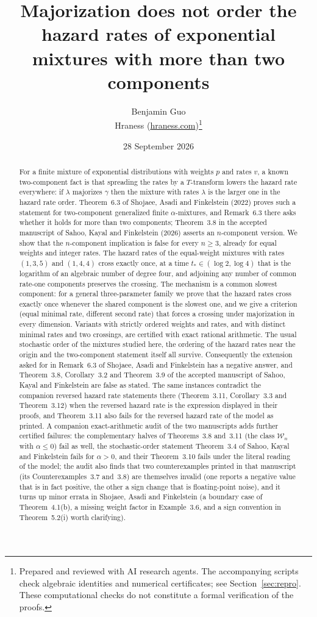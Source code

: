 \documentclass[10pt]{article}
\title{Majorization does not order the hazard rates of exponential mixtures with more than two components}
\author{Benjamin Guo\\ Hraness (\url{hraness.com})\thanks{Prepared and reviewed with AI research agents. The accompanying scripts check algebraic identities and numerical certificates; see Section~\ref{sec:repro}. These computational checks do not constitute a formal verification of the proofs.}}
\date{28 September 2026}
\theoremstyle{plain}
\theoremstyle{definition}
\theoremstyle{remark}
\begin{document}
\maketitle

\begin{abstract}
For a finite mixture of exponential distributions with weights $p$ and rates $v$, a known two-component fact is that spreading the rates by a $T$-transform lowers the hazard rate everywhere: if $\lambda$ majorizes $\gamma$ then the mixture with rates $\lambda$ is the larger one in the hazard rate order. Theorem~6.3 of Shojaee, Asadi and Finkelstein (2022) proves such a statement for two-component generalized finite $\alpha$-mixtures, and Remark~6.3 there asks whether it holds for more than two components; Theorem~3.8 in the accepted manuscript of Sahoo, Kayal and Finkelstein (2026) asserts an $n$-component version. We show that the $n$-component implication is false for every $n\ge 3$, already for equal weights and integer rates. The hazard rates of the equal-weight mixtures with rates $(1,3,5)$ and $(1,4,4)$ cross exactly once, at a time $t_*\in(\log 2,\log 4)$ that is the logarithm of an algebraic number of degree four, and adjoining any number of common rate-one components preserves the crossing. The mechanism is a common slowest component: for a general three-parameter family we prove that the hazard rates cross exactly once whenever the shared component is the slowest one, and we give a criterion (equal minimal rate, different second rate) that forces a crossing under majorization in every dimension. Variants with strictly ordered weights and rates, and with distinct minimal rates and two crossings, are certified with exact rational arithmetic. The usual stochastic order of the mixtures studied here, the ordering of the hazard rates near the origin and the two-component statement itself all survive. Consequently the extension asked for in Remark~6.3 of Shojaee, Asadi and Finkelstein has a negative answer, and Theorem~3.8, Corollary~3.2 and Theorem~3.9 of the accepted manuscript of Sahoo, Kayal and Finkelstein are false as stated. The same instances contradict the companion reversed hazard rate statements there (Theorem~3.11, Corollary~3.3 and Theorem~3.12) when the reversed hazard rate is the expression displayed in their proofs, and Theorem~3.11 also fails for the reversed hazard rate of the model as printed. A companion exact-arithmetic audit of the two manuscripts adds further certified failures: the complementary halves of Theorems~3.8 and~3.11 (the class $\mathcal W_n$ with $\alpha\le0$) fail as well, the stochastic-order statement Theorem~3.4 of Sahoo, Kayal and Finkelstein fails for $\alpha>0$, and their Theorem~3.10 fails under the literal reading of the model; the audit also finds that two counterexamples printed in that manuscript (its Counterexamples~3.7 and~3.8) are themselves invalid (one reports a negative value that is in fact positive, the other a sign change that is floating-point noise), and it turns up minor errata in Shojaee, Asadi and Finkelstein (a boundary case of Theorem~4.1(b), a missing weight factor in Example~3.6, and a sign convention in Theorem~5.2(i) worth clarifying).


\end{abstract}
\end{document}
